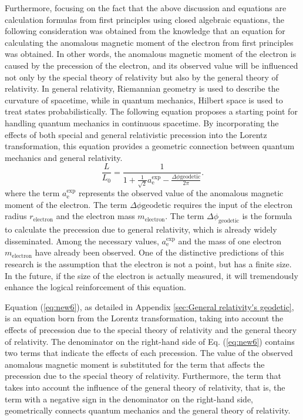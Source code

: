\documentclass[%
 reprint,
 amsmath,amssymb,
 aps,
]{revtex4-1}
\numberwithin{equation}{section}%
\begin{document}
Furthermore, focusing on the fact that the above discussion and equations are calculation formulas from first principles using closed algebraic equations, the following consideration was obtained from the knowledge that an equation for calculating the anomalous magnetic moment of the electron from first principles was obtained. In other words, the anomalous magnetic moment of the electron is caused by the precession of the electron, and its observed value will be influenced not only by the special theory of relativity but also by the general theory of relativity. In general relativity, Riemannian geometry is used to describe the curvature of spacetime, while in quantum mechanics, Hilbert space is used to treat states probabilistically. The following equation proposes a starting point for handling quantum mechanics in continuous spacetime. By incorporating the effects of both special and general relativistic precession into the Lorentz transformation, this equation provides a geometric connection between quantum mechanics and general relativity.
\begin{equation}
\frac{L}{L_0} = \frac{1}{1 + \frac{1}{\sqrt{2}}a^{\text{exp}}_{\text{e}} - \frac{\Delta \phi{\mathrm{geodetic}}}{2 \pi}} .
\label{eq:new6}
\end{equation}
\noindent where the term $a^{\text{exp}}_{\text{e}}$ represents the observed value of the anomalous magnetic moment of the electron. The term $\Delta \phi{\mathrm{geodetic}}$ requires the input of the electron radius $r_{\mathrm{electron}}$ and the electron mass $m_{\mathrm{electron}}$. The term $\Delta \phi_{\mathrm{geodetic}}$ is the formula to calculate the precession due to general relativity, which is already widely disseminated. Among the necessary values, $a^{\text{exp}}_{\text{e}}$ and the mass of one electron $m_{\mathrm{electron}}$ have already been observed. One of the distinctive predictions of this research is the assumption that the electron is not a point, but has a finite size. In the future, if the size of the electron is actually measured, it will tremendously enhance the logical reinforcement of this equation.

Equation (\ref{eq:new6}), as detailed in Appendix \ref{sec:General relativity's geodetic},  is an equation born from the Lorentz transformation, taking into account the effects of precession due to the special theory of relativity and the general theory of relativity. The denominator on the right-hand side of Eq. (\ref{eq:new6}) contains two terms that indicate the effects of each precession. The value of the observed anomalous magnetic moment is substituted for the term that affects the precession due to the special theory of relativity. Furthermore, the term that takes into account the influence of the general theory of relativity, that is, the term with a negative sign in the denominator on the right-hand side, geometrically connects quantum mechanics and the general theory of relativity.
\end{document}
